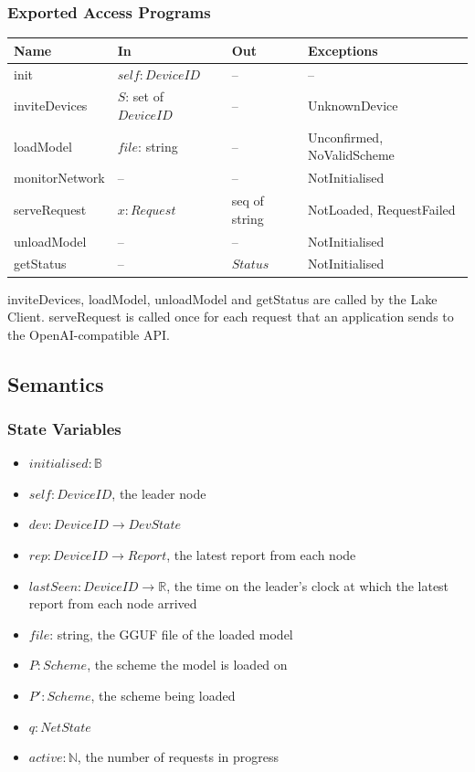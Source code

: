 \documentclass[12pt, titlepage]{article}
\begin{document}
\subsubsection{Exported Access Programs}

\begin{center}
\begin{tabular}{p{3.3cm} p{3.6cm} p{2.9cm} p{3.6cm}}
\toprule
\textbf{Name} & \textbf{In} & \textbf{Out} & \textbf{Exceptions} \\
\midrule
init & $\mathit{self}: \mathit{DeviceID}$ & -- & -- \\
inviteDevices & $S$: set of $\mathit{DeviceID}$ & -- & UnknownDevice \\
loadModel & $\mathit{file}$: string & -- & Unconfirmed, NoValidScheme \\
monitorNetwork & -- & -- & NotInitialised \\
serveRequest & $x: \mathit{Request}$ & seq of string & NotLoaded, RequestFailed \\
unloadModel & -- & -- & NotInitialised \\
getStatus & -- & $\mathit{Status}$ & NotInitialised \\
\bottomrule
\end{tabular}
\end{center}

{\raggedright \noindent inviteDevices, loadModel, unloadModel and getStatus
are called by the Lake Client. serveRequest is called once for each request
that an application sends to the OpenAI-compatible API.\par}

\subsection{Semantics}

\subsubsection{State Variables}

\begin{itemize}
  \item $\mathit{initialised}: \mathbb{B}$
  \item $\mathit{self}: \mathit{DeviceID}$, the leader node
  \item $\mathit{dev}: \mathit{DeviceID} \to \mathit{DevState}$
  \item $\mathit{rep}: \mathit{DeviceID} \to \mathit{Report}$, the latest
    report from each node
  \item $\mathit{lastSeen}: \mathit{DeviceID} \to \mathbb{R}$, the time on the
    leader's clock at which the latest report from each node arrived
  \item $\mathit{file}$: string, the GGUF file of the loaded model
  \item $P: \mathit{Scheme}$, the scheme the model is loaded on
  \item $P': \mathit{Scheme}$, the scheme being loaded
  \item $q: \mathit{NetState}$
  \item $\mathit{active}: \mathbb{N}$, the number of requests in progress
\end{itemize}
\end{document}
